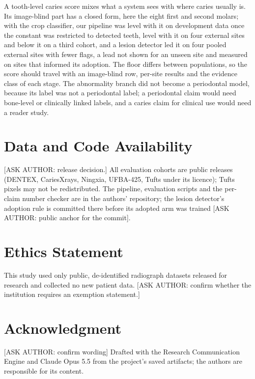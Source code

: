 \documentclass[conference]{IEEEtran}
\begin{document}
A tooth-level caries score mixes what a system sees with where caries usually is. Its image-blind part has a closed form, here the eight first and second molars; with the crop classifier, our pipeline was level with it on development data once the constant was restricted to detected teeth, level with it on four external sites and below it on a third cohort, and a lesion detector led it on four pooled external sites with fewer flags, a lead not shown for an unseen site and measured on sites that informed its adoption. The floor differs between populations, so the score should travel with an image-blind row, per-site results and the evidence class of each stage. The abnormality branch did not become a periodontal model, because its label was not a periodontal label; a periodontal claim would need bone-level or clinically linked labels, and a caries claim for clinical use would need a reader study.

\section*{Data and Code Availability}

[ASK AUTHOR: release decision.] All evaluation cohorts are public releases (DENTEX, CariesXrays, Ningxia, UFBA-425, Tufts under its licence); Tufts pixels may not be redistributed. The pipeline, evaluation scripts and the per-claim number checker are in the authors' repository; the lesion detector's adoption rule is committed there before its adopted arm was trained [ASK AUTHOR: public anchor for the commit].

\section*{Ethics Statement}

This study used only public, de-identified radiograph datasets released for research and collected no new patient data. [ASK AUTHOR: confirm whether the institution requires an exemption statement.]

\section*{Acknowledgment}

[ASK AUTHOR: confirm wording] Drafted with the Research Communication Engine and Claude Opus 5.5 from the project's saved artifacts; the authors are responsible for its content.
\end{document}
